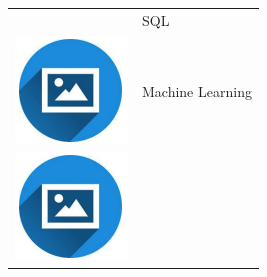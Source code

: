 \documentclass{article}
\begin{document}
\begin{paracol}{2}
\begin{tabular}{ll}
\begin{minipage}{0.1\linewidth}
         \end{minipage} & {SQL} \\[10pt]
         \begin{minipage}{0.1\linewidth}
         \includegraphics[width=\linewidth]{picon.png}
         \end{minipage} & {Machine Learning} \\[10pt]
         \begin{minipage}{0.1\linewidth}
         \includegraphics[width=\linewidth]{picon.png}

\end{minipage}
\end{tabular}
\end{paracol}
\end{document}
